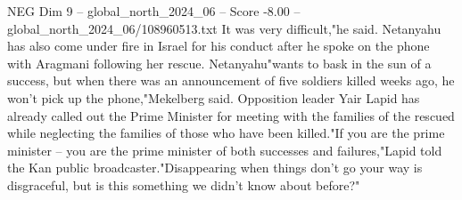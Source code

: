 \begin{textsample}{NEG Dim 9 – global\_north\_2024\_06 – Score -8.00 – global\_north\_2024\_06/108960513.txt}
It was very difficult,"he said.
Netanyahu has also come under fire in Israel for his conduct after he spoke on the phone with Aragmani following her rescue.
Netanyahu"wants to bask in the sun of a success, but when there was an announcement of five soldiers killed weeks ago, he won't pick up the phone,"Mekelberg said.
Opposition leader Yair Lapid has already called out the Prime Minister for meeting with the families of the rescued while neglecting the families of those who have been killed."If you are the prime minister -- you are the prime minister of both successes and failures,"Lapid told the Kan public broadcaster."Disappearing when things don't go your way is disgraceful, but is this something we didn't know about before?"

\end{textsample}
